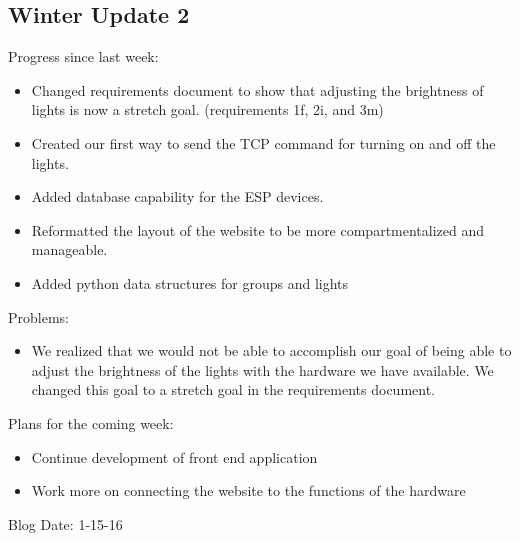 \subsection{Winter Update 2}
Progress since last week:
\begin{itemize}
   \item Changed requirements document to show that adjusting the brightness of lights is now a stretch goal. (requirements 1f, 2i, and 3m)
   \item Created our first way to send the TCP command for turning on and off the lights.
   \item Added database capability for the ESP devices.
   \item Reformatted the layout of the website to be more compartmentalized and manageable.
   \item Added python data structures for groups and lights
\end{itemize}
Problems:
\begin{itemize}
   \item We realized that we would not be able to accomplish our goal of being able to adjust the brightness of the lights with the hardware we have available. We changed this goal to a stretch goal in the requirements document.
\end{itemize}
Plans for the coming week:
\begin{itemize}
   \item Continue development of front end application
   \item Work more on connecting the website to the functions of the hardware
\end{itemize}
Blog Date: 1-15-16

